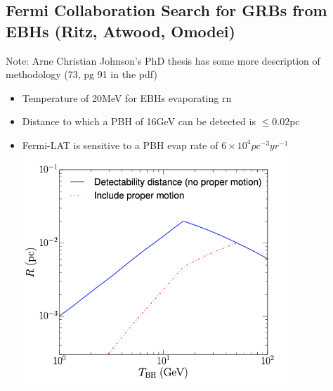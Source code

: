\documentclass[12pt]{article}
\begin{document}
\subsection{Fermi Collaboration Search for GRBs from EBHs (Ritz, Atwood, Omodei)}
Note: Arne Christian Johnson's PhD thesis has some more description of methodology (73, pg 91 in the pdf)
\begin{itemize}
    \item Temperature of 20MeV for EBHs evaporating rn
    \item Distance to which a PBH of 16GeV can be detected is $\leq 0.02$pc
    \item Fermi-LAT is sensitive to a PBH evap rate of $6\times 10^4 pc^{-3} yr^{-1}$\\
    \includegraphics[width=10cm]{FLDetectability.png}
\end{itemize}
\end{document}
